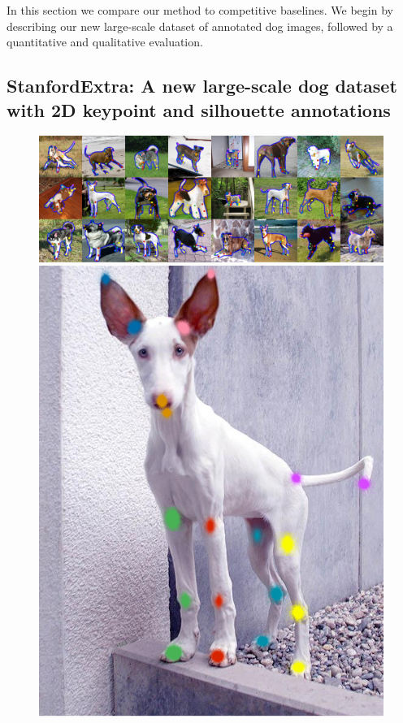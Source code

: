 

In this section we compare our method to competitive baselines. We begin by describing our new large-scale dataset of annotated dog images, followed by a quantitative and qualitative evaluation.

\subsection{StanfordExtra: A new large-scale dog dataset with 2D keypoint and silhouette annotations}

\begin{figure}[h]
    \centering
    \includegraphics[height=0.1775\textheight]{OllieFigs/collage_wide.png}
    \includegraphics[height=0.1775\textheight]{OllieFigs/heatmap.png}

\end{figure}
